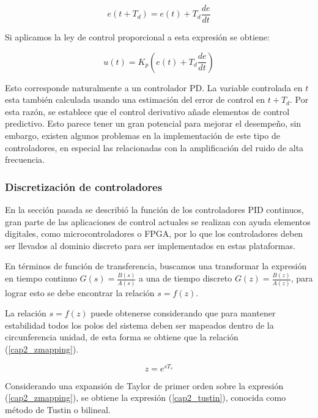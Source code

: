 \begin{equation}
e(t + T_d) = e(t) + T_d \frac{de}{dt}
\end{equation}

Si aplicamos la ley de control proporcional a esta expresión se obtiene:

\begin{equation}
u(t) = K_p \left( e(t) + T_d \frac{de}{dt} \right)
\end{equation}

Esto corresponde naturalmente a un controlador PD. La variable controlada en $t$ esta también calculada usando una estimación del error de control en $t+T_d$. Por esta razón, se establece que el control derivativo añade elementos de control predictivo. Esto parece tener un gran potencial para mejorar el desempeño, sin embargo, existen algunos problemas en la implementación de este tipo de controladores, en especial las relacionadas con la amplificación del ruido de alta frecuencia.

\subsubsection{Discretización de controladores}

En la sección pasada se describió la función de los controladores PID continuos, gran parte de las aplicaciones de control actuales se realizan con ayuda elementos digitales, como microcontroladores o FPGA, por lo que los controladores deben ser llevados al dominio discreto para ser implementados en estas plataformas.

En términos de función de transferencia, buscamos una transformar la expresión en tiempo continuo $G(s)=\frac{B(s)}{A(s)}$ a una de tiempo discreto  $G(z)=\frac{B(z)}{A(z)}$, para lograr esto se debe encontrar la relación $s=f(z)$.

La relación $s=f(z)$ puede obtenerse considerando que para mantener estabilidad todos los polos del sistema deben ser mapeados dentro de la circunferencia unidad, de esta forma se obtiene que la relación (\ref{cap2_zmapping})\cite{oppenheim2009}.

\begin{equation}\label{cap2_zmapping}
z=e^{s T_s}
\end{equation}

Considerando una expansión de Taylor de primer orden sobre la expresión (\ref{cap2_zmapping}), se obtiene la expresión (\ref{cap2_tustin}), conocida como método de Tustin o bilineal.

